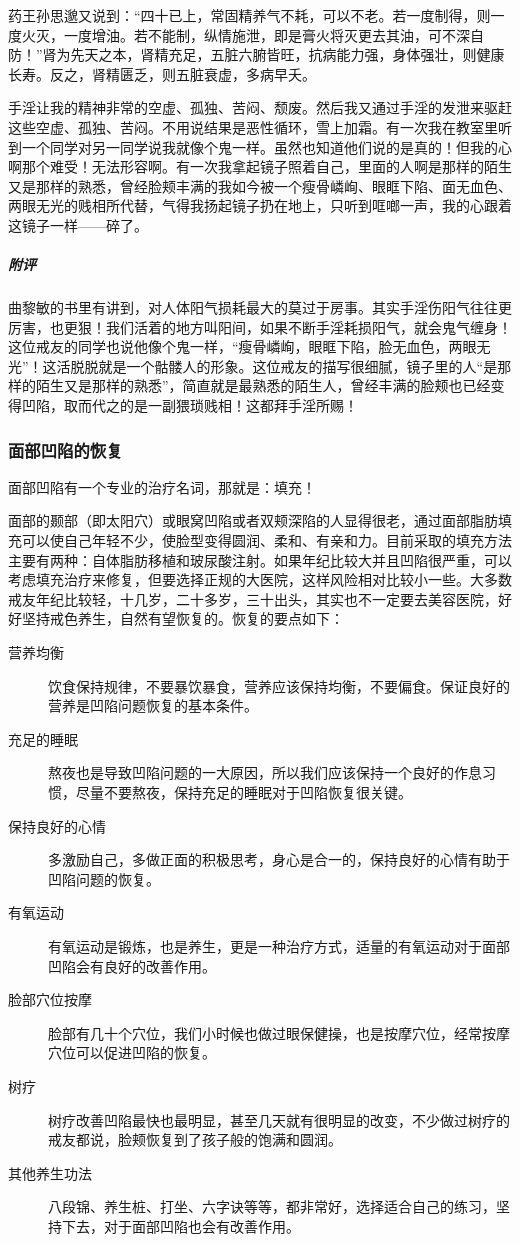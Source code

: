药王孙思邈又说到：“四十已上，常固精养气不耗，可以不老。若一度制得，则一度火灭，一度增油。若不能制，纵情施泄，即是膏火将灭更去其油，可不深自防！”肾为先天之本，肾精充足，五脏六腑皆旺，抗病能力强，身体强壮，则健康长寿。反之，肾精匮乏，则五脏衰虚，多病早夭。

\begin{case}[面部凹陷]
    手淫让我的精神非常的空虚、孤独、苦闷、颓废。然后我又通过手淫的发泄来驱赶这些空虚、孤独、苦闷。不用说结果是恶性循环，雪上加霜。有一次我在教室里听到一个同学对另一同学说我就像个鬼一样。虽然也知道他们说的是真的！但我的心啊那个难受！无法形容啊。有一次我拿起镜子照着自己，里面的人啊是那样的陌生又是那样的熟悉，曾经脸颊丰满的我如今被一个瘦骨嶙峋、眼眶下陷、面无血色、两眼无光的贱相所代替，气得我扬起镜子扔在地上，只听到哐啷一声，我的心跟着这镜子一样——碎了。
    \subparagraph{附评} 曲黎敏的书里有讲到，对人体阳气损耗最大的莫过于房事。其实手淫伤阳气往往更厉害，也更狠！我们活着的地方叫阳间，如果不断手淫耗损阳气，就会鬼气缠身！这位戒友的同学也说他像个鬼一样，“瘦骨嶙峋，眼眶下陷，脸无血色，两眼无光”！这活脱脱就是一个骷髅人的形象。这位戒友的描写很细腻，镜子里的人“是那样的陌生又是那样的熟悉”，简直就是最熟悉的陌生人，曾经丰满的脸颊也已经变得凹陷，取而代之的是一副猥琐贱相！这都拜手淫所赐！
\end{case}

\subsubsection{面部凹陷的恢复}

面部凹陷有一个专业的治疗名词，那就是：填充！

面部的颞部（即太阳穴）或眼窝凹陷或者双颊深陷的人显得很老，通过面部脂肪填充可以使自己年轻不少，使脸型变得圆润、柔和、有亲和力。目前采取的填充方法主要有两种：自体脂肪移植和玻尿酸注射。如果年纪比较大并且凹陷很严重，可以考虑填充治疗来修复，但要选择正规的大医院，这样风险相对比较小一些。大多数戒友年纪比较轻，十几岁，二十多岁，三十出头，其实也不一定要去美容医院，好好坚持戒色养生，自然有望恢复的。恢复的要点如下：

\begin{description}
    \item[营养均衡] 饮食保持规律，不要暴饮暴食，营养应该保持均衡，不要偏食。保证良好的营养是凹陷问题恢复的基本条件。
    \item[充足的睡眠] 熬夜也是导致凹陷问题的一大原因，所以我们应该保持一个良好的作息习惯，尽量不要熬夜，保持充足的睡眠对于凹陷恢复很关键。
    \item[保持良好的心情] 多激励自己，多做正面的积极思考，身心是合一的，保持良好的心情有助于凹陷问题的恢复。
    \item[有氧运动] 有氧运动是锻炼，也是养生，更是一种治疗方式，适量的有氧运动对于面部凹陷会有良好的改善作用。
    \item[脸部穴位按摩] 脸部有几十个穴位，我们小时候也做过眼保健操，也是按摩穴位，经常按摩穴位可以促进凹陷的恢复。
    \item[树疗] 树疗改善凹陷最快也最明显，甚至几天就有很明显的改变，不少做过树疗的戒友都说，脸颊恢复到了孩子般的饱满和圆润。
    \item[其他养生功法] 八段锦、养生桩、打坐、六字诀等等，都非常好，选择适合自己的练习，坚持下去，对于面部凹陷也会有改善作用。
\end{description}


